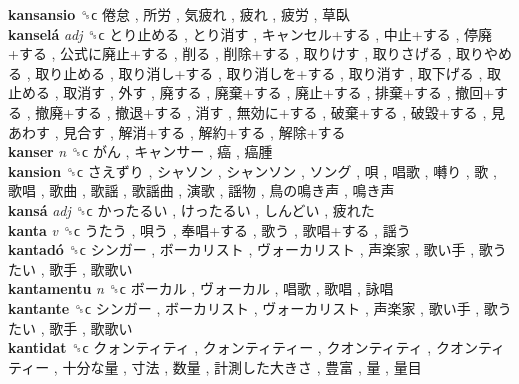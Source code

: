 \textbf{kansansio} ␝ϲ   倦怠 ,  所労 ,  気疲れ ,  疲れ ,  疲労 ,  草臥   \\
\textbf{kanselá} \emph{adj}  ␝ϲ   とり止める ,  とり消す ,  キャンセル+する ,  中止+する ,  停廃+する ,  公式に廃止+する ,  削る ,  削除+する ,  取りけす ,  取りさげる ,  取りやめる ,  取り止める ,  取り消し+する ,  取り消しを+する ,  取り消す ,  取下げる ,  取止める ,  取消す ,  外す ,  廃する ,  廃棄+する ,  廃止+する ,  排棄+する ,  撤回+する ,  撤廃+する ,  撤退+する ,  消す ,  無効に+する ,  破棄+する ,  破毀+する ,  見あわす ,  見合す ,  解消+する ,  解約+する ,  解除+する   \\
\textbf{kanser} \emph{n}  ␝ϲ   がん ,  キャンサー ,  癌 ,  癌腫   \\
\textbf{kansion} ␝ϲ   さえずり ,  シャソン ,  シャンソン ,  ソング ,  唄 ,  唱歌 ,  囀り ,  歌 ,  歌唱 ,  歌曲 ,  歌謡 ,  歌謡曲 ,  演歌 ,  謡物 ,  鳥の鳴き声 ,  鳴き声   \\
\textbf{kansá} \emph{adj}  ␝ϲ   かったるい ,  けったるい ,  しんどい ,  疲れた   \\
\textbf{kanta} \emph{v}  ␝ϲ   うたう ,  唄う ,  奉唱+する ,  歌う ,  歌唱+する ,  謡う   \\
\textbf{kantadó} ␝ϲ   シンガー ,  ボーカリスト ,  ヴォーカリスト ,  声楽家 ,  歌い手 ,  歌うたい ,  歌手 ,  歌歌い   \\
\textbf{kantamentu} \emph{n}  ␝ϲ   ボーカル ,  ヴォーカル ,  唱歌 ,  歌唱 ,  詠唱   \\
\textbf{kantante} ␝ϲ   シンガー ,  ボーカリスト ,  ヴォーカリスト ,  声楽家 ,  歌い手 ,  歌うたい ,  歌手 ,  歌歌い   \\
\textbf{kantidat} ␝ϲ   クォンティティ ,  クォンティティー ,  クオンティティ ,  クオンティティー ,  十分な量 ,  寸法 ,  数量 ,  計測した大きさ ,  豊富 ,  量 ,  量目   \\
